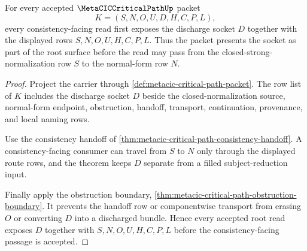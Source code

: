 \begin{theorem}
\label{thm:metacic-critical-path-root-socket-totality}
For every accepted $\MetaCICCriticalPathUp$ packet
$$
K=(S,N,O,U,D,H,C,P,L),
$$
every consistency-facing read first exposes the discharge socket $D$ together with the displayed rows $S,N,O,U,H,C,P,L$. Thus the packet presents the socket as part of the root surface before the read may pass from the closed-strong-normalization row $S$ to the normal-form row $N$.
\end{theorem}
\begin{proof}
Project the carrier through \autoref{def:metacic-critical-path-packet}. The row list of $K$ includes the discharge socket $D$ beside the closed-normalization source, normal-form endpoint, obstruction, handoff, transport, continuation, provenance, and local naming rows.

Use the consistency handoff of \autoref{thm:metacic-critical-path-consistency-handoff}. A consistency-facing consumer can travel from $S$ to $N$ only through the displayed route rows, and the theorem keeps $D$ separate from a filled subject-reduction input.

Finally apply the obstruction boundary, \autoref{thm:metacic-critical-path-obstruction-boundary}. It prevents the handoff row or componentwise transport from erasing $O$ or converting $D$ into a discharged bundle. Hence every accepted root read exposes $D$ together with $S,N,O,U,H,C,P,L$ before the consistency-facing passage is accepted.
\end{proof}

